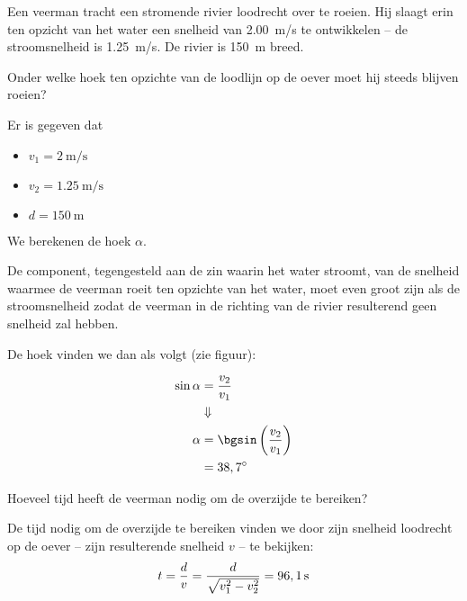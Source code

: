 \documentclass{ximera}
\begin{document}
\begin{exercise}

Een veerman tracht een stromende rivier loodrecht over te roeien. 
Hij slaagt erin ten opzicht van het water een snelheid van \SI{2,00}{m/s} te ontwikkelen -- de stroomsnelheid is \SI{1,25}{m/s}. 
De rivier is \SI{150}{\meter} breed. 

\begin{question}
 Onder welke hoek ten opzichte van de loodlijn op de oever moet hij steeds blijven roeien?
\begin{oplossing}
Er is gegeven dat

\begin{itemize}
	\item $v_1=\SI{2}{\meter\per\second}$
	\item$v_2=\SI{1,25}{\meter\per\second}$
	\item $d=\SI{150}{\meter}$
\end{itemize}

We berekenen de hoek $\alpha$. 


De component, tegengesteld aan de zin waarin het water stroomt, van de snelheid waarmee de veerman roeit ten opzichte van het water, moet even groot zijn als de stroomsnelheid zodat de veerman in de richting van de rivier resulterend geen snelheid zal hebben.


De hoek vinden we dan als volgt (zie figuur):

\begin{align*}
\sin{\alpha} &= \frac{v_2}{v_1}\\
&\Downarrow\\
\alpha&=\bgsin\left(\frac{v_2}{v_1}\right)\\
&=38,7^\circ
\end{align*}

\end{oplossing}

\end{question}
\begin{question}
Hoeveel tijd heeft de veerman nodig om de overzijde te bereiken? 

\begin{oplossing}
De tijd nodig om de overzijde te bereiken vinden we door zijn snelheid loodrecht op de oever -- zijn resulterende snelheid $v$ -- te bekijken:
	\begin{align*}
		t=\frac{d}{v}=\frac{d}{\sqrt{v_1^2-v_2^2}}=96,1{\rm\,s}
	\end{align*}

\end{oplossing}
\end{question}
\end{exercise}
\end{document}
